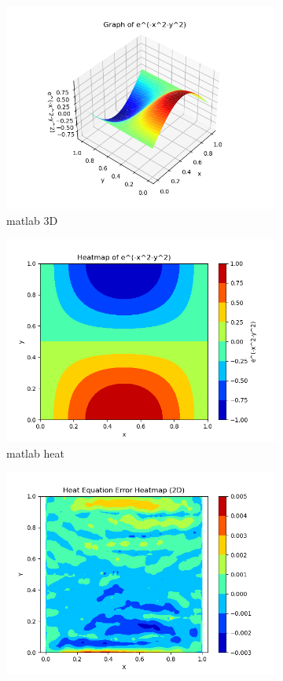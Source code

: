 \begin{figure}[H]
    \begin{subfigure}{0.33\textwidth}  
        \centering  
        \includegraphics[width=0.9\linewidth]{./pics/final/spacetime/regular/true3D.png}  
        \caption{matlab 3D}  
    \end{subfigure}%
    \begin{subfigure}{0.33\textwidth}  
        \centering  
        \includegraphics[width=0.9\linewidth]{./pics/final/spacetime/regular/trueheat.png}  
        \caption{matlab heat}
    \end{subfigure} 
    \begin{subfigure}{0.33\textwidth}  
        \centering  
        \includegraphics[width=0.9\linewidth]{./pics/final/spacetime/regular/error001.png}  

\end{subfigure}
\end{figure}
